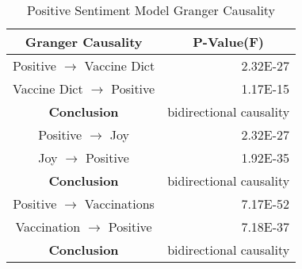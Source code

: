 \begin{table}[H]
\centering
\begin{tabular}{@{}cr@{}}
\toprule
\textbf{Granger Causality} & \multicolumn{1}{c}{\textbf{P-Value(F)}} \\ \midrule
Positive   $\rightarrow$ Vaccine Dict & 2.32E-27 \\
Vaccine Dict $\rightarrow$  Positive & 1.17E-15 \\
\textbf{Conclusion} & bidirectional causality \\
Positive   $\rightarrow$  Joy & 2.32E-27 \\
Joy $\rightarrow$  Positive & 1.92E-35 \\
\textbf{Conclusion} & bidirectional causality \\
Positive   $\rightarrow$  Vaccinations & 7.17E-52 \\
Vaccination $\rightarrow$  Positive & 7.18E-37 \\
\textbf{Conclusion} & bidirectional causality \\
\bottomrule
\end{tabular}
\caption{Positive Sentiment Model Granger Causality}
\label{tab:model 3 causality}
\end{table}

